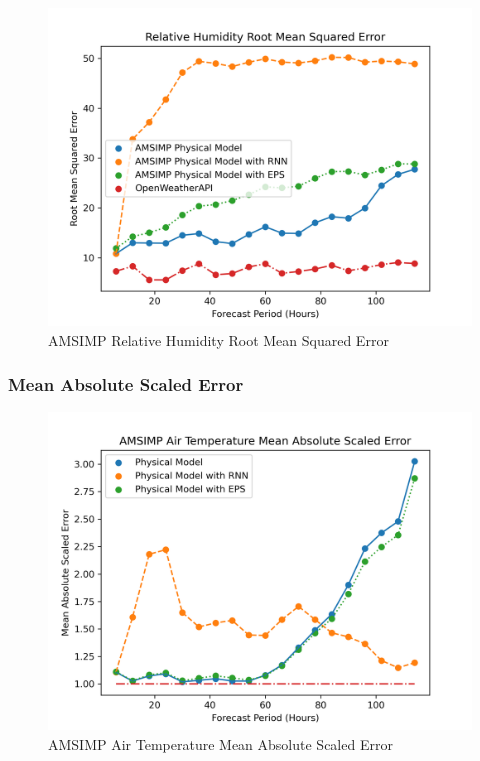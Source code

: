 \begin{appendices}
    \begin{figure}[H]
        \centering
        \includegraphics[width=.7\linewidth]{Graphs/accuracy/appendices/amsimp/relative_humidity/root_mean_squared_error.png}
        \caption{AMSIMP Relative Humidity Root Mean Squared Error}
    \end{figure}
    
    \subsubsection{Mean Absolute Scaled Error}
    \begin{figure}[H]
        \centering
        \includegraphics[width=.7\linewidth]{Graphs/accuracy/appendices/amsimp/temperature/mean_absolute_scaled_error.png}
        \caption{AMSIMP Air Temperature Mean Absolute Scaled Error}
    \end{figure}
    

\end{appendices}
